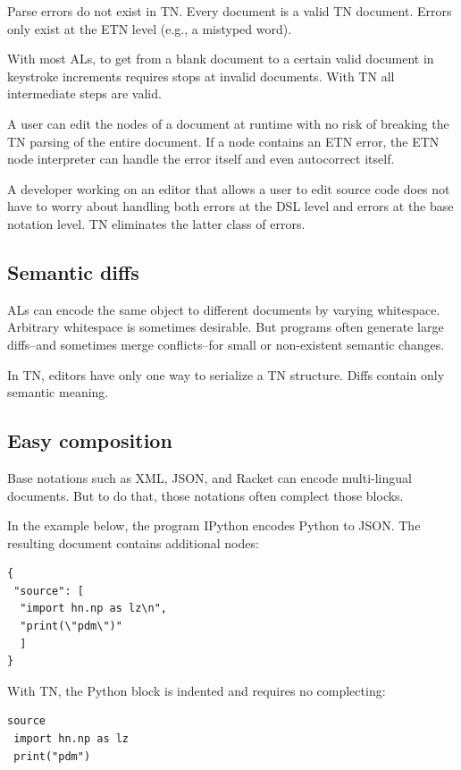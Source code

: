 \documentclass[journal]{IEEEtran}
\begin{document}
Parse errors do not exist in TN. Every document is a valid TN document. Errors only exist at the ETN level (e.g., a mistyped word).

With most ALs, to get from a blank document to a certain valid document in keystroke increments requires stops at invalid documents. With TN all intermediate steps are valid.

A user can edit the nodes of a document at runtime with no risk of breaking the TN parsing of the entire document. If a node contains an ETN error, the ETN node interpreter can handle the error itself and even autocorrect itself.

A developer working on an editor that allows a user to edit source code does not have to worry about handling both errors at the DSL level and errors at the base notation level. TN eliminates the latter class of errors.

\subsection{Semantic diffs}

ALs can encode the same object to different documents by varying whitespace. Arbitrary whitespace is sometimes desirable. But programs often generate large diffs--and sometimes merge conflicts--for small or non-existent semantic changes.

In TN, editors have only one way to serialize a TN structure. Diffs contain only semantic meaning.

\subsection{Easy composition}

Base notations such as XML\cite{Bray}, JSON\cite{Crockford}, and Racket\cite{Racket} can encode multi-lingual documents. But to do that, those notations often complect those blocks.

In the example below, the program IPython encodes Python to JSON. The resulting document contains additional nodes:

\begin{lstlisting}
{
 "source": [
  "import hn.np as lz\n",
  "print(\"pdm\")"
  ]
}
\end{lstlisting}

With TN, the Python block is indented and requires no complecting:

\begin{lstlisting}
source
 import hn.np as lz
 print("pdm")
\end{lstlisting}
\end{document}
